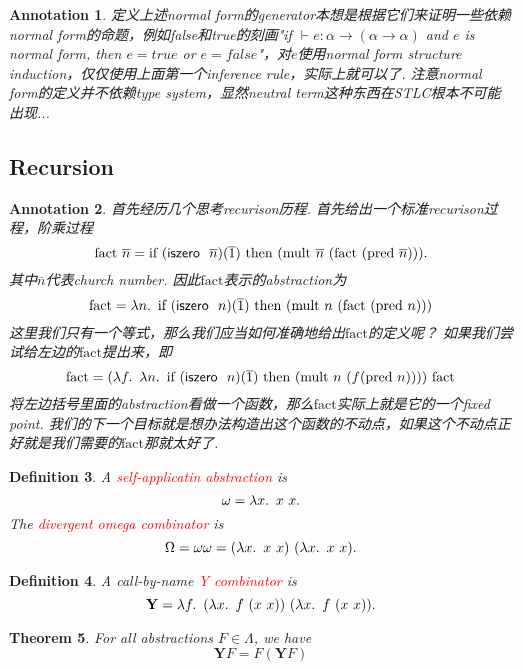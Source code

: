 \documentclass{article}
\theoremstyle{plain}
\newtheorem{theorem}{Theorem}
\newtheorem{definition}[theorem]{Definition}
\newtheorem{annotation}[theorem]{Annotation}
\theoremstyle{nonumberplain}
\newcommand{\lam}[2]{\ensuremath{\lambda #1\ldotp~ #2}} %
\newcommand{\term}[1]{\ensuremath\mathsf{#1}}
\newcommand{\iszero}[1]{\term{iszero}~#1}
\newcommand{\redt}[1]{\textcolor{red}{#1}}
\begin{document}
\begin{annotation}
\rm 定义上述normal form的generator本想是根据它们来证明一些依赖normal form的命题，例如false和true的刻画"if $\vdash e:\alpha \to (\alpha \to \alpha)$ and $e$ is normal form, then $e = true$ or $e = false$"，对$e$使用normal form structure induction，仅仅使用上面第一个inference rule，实际上就可以了. 注意normal form的定义并不依赖type system，显然neutral term这种东西在STLC根本不可能出现... 
\end{annotation}

\newpage
\subsection{Recursion}

\begin{annotation}
\rm 首先经历几个思考recurison历程. 首先给出一个标准recurison过程，阶乘过程
$$
\text{fact}~\overline{n} = \text{if}~(\iszero~\overline{n})(\overline{1})~\text{then}~(\text{mult}~\overline{n}~(\text{fact}~(\text{pred}~\overline{n}))). 
$$
其中$\overline{n}$代表church number. 因此$\text{fact}$表示的abstraction为
$$
\text{fact} = \lam{n}{\text{if}~(\iszero~n)(\overline{1})~\text{then}~(\text{mult}~n~(\text{fact}~(\text{pred}~n)))}
$$
这里我们只有一个等式，那么我们应当如何准确地给出$\text{fact}$的定义呢？ 如果我们尝试给左边的$\text{fact}$提出来，即
$$
\text{fact} = (\lam{f}{\lam{n}{\text{if}~(\iszero~n)(\overline{1})~\text{then}~(\text{mult}~n~(f(\text{pred}~n)))}})~\text{fact}
$$
将左边括号里面的abstraction看做一个函数，那么$\text{fact}$实际上就是它的一个fixed point. 我们的下一个目标就是想办法构造出这个函数的不动点，如果这个不动点正好就是我们需要的$\text{fact}$那就太好了.
\end{annotation}


\begin{definition}
\rm A \redt{self-applicatin abstraction} is 
$$
\omega = \lam{x}{x~x}.
$$
The \redt{divergent omega combinator} is 
\[
	\Omega = \omega \omega = (\lam{x}{x~x})~(\lam{x}{x~x}).
\]
\end{definition}

\begin{definition}
\rm A  call-by-name \redt{Y combinator} is
$$
\mathbf{Y} = \lam{f}{(\lam{x}{f~(x~x)})~(\lam{x}{f~(x~x)})}.
$$
\end{definition}

\begin{theorem}
\rm For all abstractions $F \in \Lambda$, we have 
$$
\mathbf{Y}F = F(\mathbf{Y}F)
$$
\end{theorem}
\end{document}
